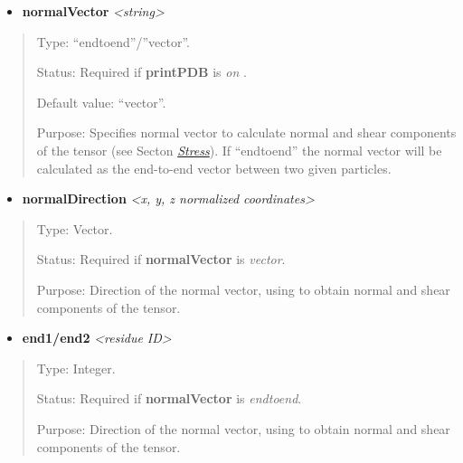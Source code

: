 \documentclass[letterpaper,10pt,english]{sphinxmanual}
\begin{document}
\begin{itemize}
\item {} 
\textbf{normalVector} \emph{\textless{}string\textgreater{}}

\end{itemize}
\begin{quote}

Type: ``endtoend''/''vector''.

Status: Required if \textbf{printPDB} is \emph{on} .

Default value: ``vector''.

Purpose: Specifies normal vector to calculate normal and shear components of the tensor (see Secton {\hyperref[general:theorstress]{\emph{Stress}}}). If ``endtoend'' the normal vector will be calculated as the end-to-end vector between two given particles.
\end{quote}
\begin{itemize}
\item {} 
\textbf{normalDirection} \emph{\textless{}x, y, z normalized coordinates\textgreater{}}

\end{itemize}
\begin{quote}

Type: Vector.

Status: Required if \textbf{normalVector} is \emph{vector}.

Purpose: Direction of the normal vector, using to obtain normal and shear components of the tensor.
\end{quote}
\begin{itemize}
\item {} 
\textbf{end1/end2} \emph{\textless{}residue ID\textgreater{}}

\end{itemize}
\begin{quote}

Type: Integer.

Status: Required if \textbf{normalVector} is \emph{endtoend}.

Purpose: Direction of the normal vector, using to obtain normal and shear components of the tensor.
\end{quote}
\end{document}
